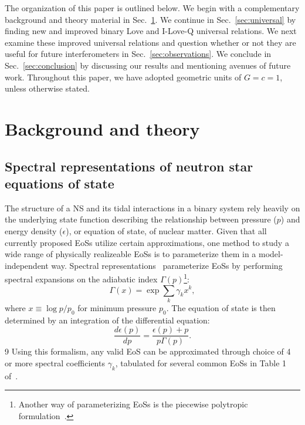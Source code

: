 \documentclass[prd,twocolumn,nofootinbib,superscriptaddress,amsmath,amssymb]{revtex4-1}
\begin{document}
The organization of this paper is outlined below.
We begin with a complementary background and theory material in Sec.~\ref{sec:theory}.
We continue in Sec.~\ref{sec:universal} by finding new and improved binary Love and I-Love-Q universal relations.
We next examine these improved universal relations and question whether or not they are useful for future interferometers in Sec.~\ref{sec:observations}.
We conclude in Sec.~\ref{sec:conclusion} by discussing our results and mentioning avenues of future work.
Throughout this paper, we have adopted geometric units of $G=c=1$, unless otherwise stated.

\section{Background and theory}\label{sec:theory}

\subsection{Spectral representations of neutron star equations of state}\label{sec:eos}
The structure of a NS and its tidal interactions in a binary system rely heavily on the underlying state function describing the relationship between pressure ($p$) and energy density ($\epsilon$), or equation of state, of nuclear matter.
Given that all currently proposed EoSs utilize certain approximations, one method to study a wide range of physically realizeable EoSs is to parameterize them in a model-independent way.
Spectral representations~\cite{Lindblom:2010bb,Lindblom:2012zi,Lindblom:2013kra,Lindblom:2018rfr,Abbott:2018exr} parameterize EoSs by performing spectral expansions on the adiabatic index $\Gamma(p)$\footnote{Another way of parameterizing EoSs is the piecewise polytropic formulation~\cite{Read2009,Lackey:2014fwa,Carney:2018sdv}.}:
\begin{equation}
\Gamma(x) = \exp{\sum_k\gamma_k x^k},
\end{equation}
where $x \equiv \log{p/p_0}$ for minimum pressure $p_0$.
The equation of state is then determined by an integration of the differential equation:
\begin{equation}
\frac{d \epsilon(p)}{dp}=\frac{\epsilon(p)+p}{p \Gamma(p)}.
\end{equation}9
Using this formalism, any valid EoS can be approximated through choice of 4 or more spectral coefficients $\gamma_k$, tabulated for several common EoSs in Table 1 of~\cite{Lindblom:2018rfr}.
\end{document}
